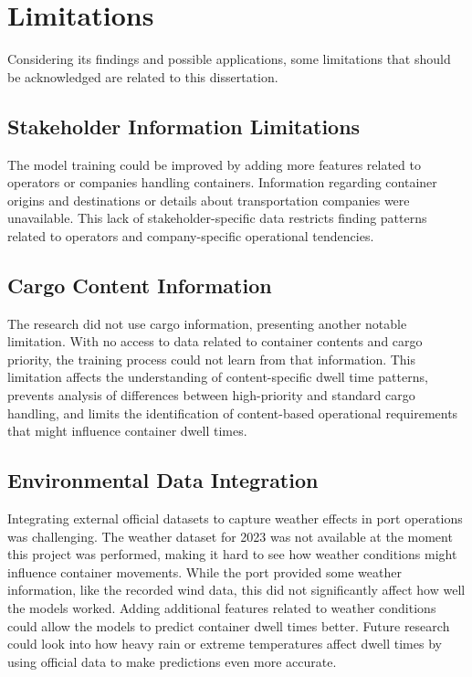 \chapter{Limitations}

	Considering its findings and possible applications, some limitations that should be acknowledged are related to
	this dissertation.


	\section{Stakeholder Information Limitations}

		The model training could be improved by adding more features related to operators or companies handling
		containers. Information regarding container origins and destinations or details about transportation companies
		were unavailable. This lack of stakeholder-specific data restricts finding patterns related to operators and
		company-specific operational tendencies.


	\section{Cargo Content Information}

		The research did not use cargo information, presenting another notable limitation. With no access to data
		related to container contents and cargo priority, the training process could not learn from that information.
		This limitation affects the understanding of content-specific dwell time patterns, prevents analysis of
		differences between high-priority and standard cargo handling, and limits the identification of content-based
		operational requirements that might influence container dwell times.


	\section{Environmental Data Integration}

		Integrating external official datasets to capture weather effects in port operations was challenging. The
		weather dataset for 2023 was not available at the moment this project was performed, making it hard to see how
		weather conditions might influence container movements. While the port provided some weather information, like
		the recorded wind data, this did not significantly affect how well the models worked. Adding additional
		features related to weather conditions could allow the models to predict container dwell times better. Future
		research could look into how heavy rain or extreme temperatures affect dwell times by using official data to
		make predictions even more accurate.


